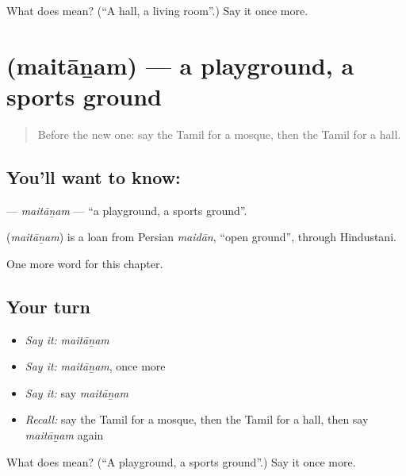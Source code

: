 \begin{tcolorbox}[breakable,colback=teal!4,colframe=teal!35!black,title={Before you move on}]
What does  mean? (\textquotedblleft{}A hall, a living room\textquotedblright{}.) Say it once more.
\end{tcolorbox}
\section[\texorpdfstring{\ta{மைதானம்} (maitāṉam)}{மைதானம் (maitāṉam)}]{ (maitāṉam) — a playground, a sports ground}

\label{lesson:TA-C206-maitanam}



\begin{quote}
Before the new one: say the Tamil for a mosque, then the Tamil for a hall.
\end{quote}

\subsection*{You'll want to know: }
\textbf{} — \emph{maitāṉam} — \textquotedblleft{}a playground, a sports ground\textquotedblright{}.

\begin{cousinweb}
\textbf{} (\emph{maitāṉam}) is a loan from Persian \emph{maidān}, \textquotedblleft{}open ground\textquotedblright{}, through Hindustani.
\end{cousinweb}

\begin{grammarlens}[title={What you've built}]
One more word for this chapter.
\end{grammarlens}

\subsection*{Your turn}
\begin{itemize}
\raggedright
  \item \emph{Say it:} \emph{maitāṉam}
  \item \emph{Say it:} \emph{maitāṉam}, once more
  \item \emph{Say it:} say \emph{maitāṉam}
  \item \emph{Recall:} say the Tamil for a mosque, then the Tamil for a hall, then say \emph{maitāṉam} again
\end{itemize}

\begin{tcolorbox}[breakable,colback=teal!4,colframe=teal!35!black,title={Before you move on}]
What does  mean? (\textquotedblleft{}A playground, a sports ground\textquotedblright{}.) Say it once more.
\end{tcolorbox}
